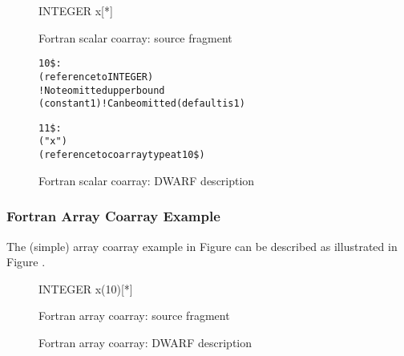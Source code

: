 \begin{figure}[!ht]
\begin{nlnlisting}
        INTEGER x[*]
\end{nlnlisting}
\caption{Fortran scalar coarray: source fragment}
\label{fig:Fortranscalarcoarraysourcefragment}
\end{figure}

\begin{figure}[!ht]
\begin{dwflisting}
\begin{alltt}
10\$:  \DWTAGcoarraytype
          \DWATtype(reference to INTEGER)
          \DWTAGsubrangetype                ! Note omitted upper bound
          \DWATlowerbound(constant 1)       ! Can be omitted (default is 1)

11\$:  \DWTAGvariable
          \DWATname("x")
          \DWATtype(reference to coarray type at 10\$)
\end{alltt}
\end{dwflisting}
\caption{Fortran scalar coarray: DWARF description}
\label{fig:FortranscalarcoarrayDWARFdescription}
\end{figure}

\subsubsection{Fortran Array Coarray Example}
The  (simple) array coarray example
in Figure  can be described as 
illustrated in Figure .

\begin{figure}[ht]
\begin{nlnlisting}
        INTEGER x(10)[*]
\end{nlnlisting}
\caption{Fortran array coarray: source fragment}
\label{fig:Fortranarraycoarraysourcefragment}
\end{figure}

\begin{figure}[ht]
\caption{Fortran array coarray: DWARF description}
\label{fig:FortranarraycoarrayDWARFdescription}
\end{figure}

